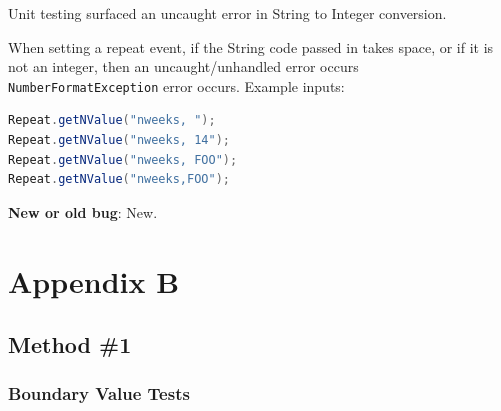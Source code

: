 Unit testing surfaced an uncaught error in String to Integer conversion.

When setting a repeat event, if the String code passed in takes space,
or if it is not an integer, then an uncaught/unhandled error occurs
\lstinline!NumberFormatException! error occurs. Example inputs:

\begin{lstlisting}[language=Java]
Repeat.getNValue("nweeks, ");
Repeat.getNValue("nweeks, 14");
Repeat.getNValue("nweeks, FOO");
Repeat.getNValue("nweeks,FOO");
\end{lstlisting}

\textbf{New or old bug}: New.

\newpage

\section{Appendix B}\label{appendix-b}

\subsection{Method \#1}\label{method-1}

\subsubsection{Boundary Value Tests}\label{boundary-value-tests}

